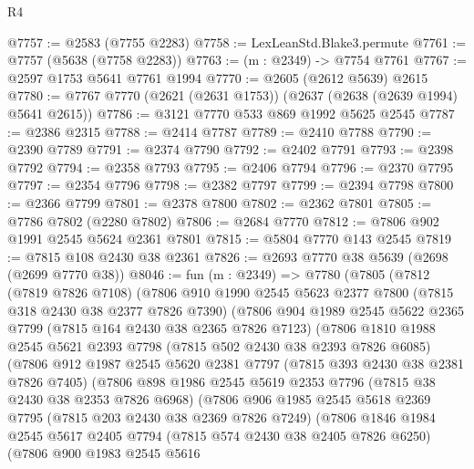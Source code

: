 \begin{lexlean}{R4}
\begin{coremodule}
@7757 := @2583 (@7755 @2283)
@7758 := LexLeanStd.Blake3.permute
@7761 := @7757 (@5638 (@7758 @2283))
@7763 := (m : @2349) -> @7754 @7761
@7767 := @2597 @1753 @5641 @7761 @1994
@7770 := @2605 (@2612 @5639) @2615
@7780 := @7767 @7770 (@2621 (@2631 @1753)) (@2637 (@2638 (@2639 @1994) @5641 @2615))
@7786 := @3121 @7770 @533 @869 @1992 @5625 @2545
@7787 := @2386 @2315
@7788 := @2414 @7787
@7789 := @2410 @7788
@7790 := @2390 @7789
@7791 := @2374 @7790
@7792 := @2402 @7791
@7793 := @2398 @7792
@7794 := @2358 @7793
@7795 := @2406 @7794
@7796 := @2370 @7795
@7797 := @2354 @7796
@7798 := @2382 @7797
@7799 := @2394 @7798
@7800 := @2366 @7799
@7801 := @2378 @7800
@7802 := @2362 @7801
@7805 := @7786 @7802 (@2280 @7802)
@7806 := @2684 @7770
@7812 := @7806 @902 @1991 @2545 @5624 @2361 @7801
@7815 := @5804 @7770 @143 @2545
@7819 := @7815 @108 @2430 @38 @2361
@7826 := @2693 @7770 @38 @5639 (@2698 (@2699 @7770 @38))
@8046 := fun (m : @2349) =>
  @7780
    (@7805
      (@7812
        (@7819 @7826 @7108)
        (@7806
          @910
          @1990
          @2545
          @5623
          @2377
          @7800
          (@7815 @318 @2430 @38 @2377 @7826 @7390)
          (@7806
            @904
            @1989
            @2545
            @5622
            @2365
            @7799
            (@7815 @164 @2430 @38 @2365 @7826 @7123)
            (@7806
              @1810
              @1988
              @2545
              @5621
              @2393
              @7798
              (@7815 @502 @2430 @38 @2393 @7826 @6085)
              (@7806
                @912
                @1987
                @2545
                @5620
                @2381
                @7797
                (@7815 @393 @2430 @38 @2381 @7826 @7405)
                (@7806
                  @898
                  @1986
                  @2545
                  @5619
                  @2353
                  @7796
                  (@7815 @38 @2430 @38 @2353 @7826 @6968)
                  (@7806
                    @906
                    @1985
                    @2545
                    @5618
                    @2369
                    @7795
                    (@7815 @203 @2430 @38 @2369 @7826 @7249)
                    (@7806
                      @1846
                      @1984
                      @2545
                      @5617
                      @2405
                      @7794
                      (@7815 @574 @2430 @38 @2405 @7826 @6250)
                      (@7806
                        @900
                        @1983
                        @2545
                        @5616

\end{coremodule}
\end{lexlean}
